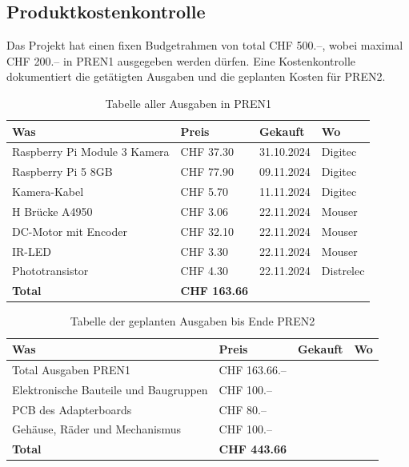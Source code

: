 \documentclass[../main.tex]{subfiles}
\begin{document}
\subsection{Produktkostenkontrolle}
Das Projekt hat einen fixen Budgetrahmen von total CHF 500.--, wobei maximal CHF 200.-- in PREN1 ausgegeben werden dürfen. Eine Kostenkontrolle dokumentiert die getätigten Ausgaben und die geplanten Kosten für PREN2.
\begin{table}[H]
\begin{tabular}{|p{6cm}|p{2.5cm}|p{2cm}|p{2.5cm}|}
\hline
\textbf{Was} & \textbf{Preis} & \textbf{Gekauft} & \textbf{Wo} \\ \hline
Raspberry Pi Module 3 Kamera & CHF 37.30 & 31.10.2024 & Digitec \\ \hline
Raspberry Pi 5 8GB & CHF 77.90 & 09.11.2024 & Digitec \\ \hline
Kamera-Kabel & CHF 5.70 & 11.11.2024 & Digitec \\ \hline
H Brücke A4950 & CHF 3.06 & 22.11.2024 & Mouser \\ \hline
DC-Motor mit Encoder & CHF 32.10 & 22.11.2024 & Mouser \\ \hline
IR-LED & CHF 3.30 & 22.11.2024 & Mouser \\ \hline
Phototransistor & CHF 4.30 & 22.11.2024 & Distrelec \\ \hline
\hline
\textbf{Total} & \textbf{CHF 163.66} & & \\ \hline
\end{tabular}
\caption{Tabelle aller Ausgaben in PREN1}
\label{tab:ausgaben_pren1}
\end{table}

\begin{table}[H]
\begin{tabular}{|p{6cm}|p{2.5cm}|p{2cm}|p{2.5cm}|}
\hline
\textbf{Was} & \textbf{Preis} & \textbf{Gekauft} & \textbf{Wo} \\ \hline
Total Ausgaben PREN1 & CHF 163.66.-- &  &  \\ \hline
Elektronische Bauteile und Baugruppen & CHF 100.-- &  &  \\ \hline
PCB des Adapterboards & CHF 80.-- &  &  \\ \hline
Gehäuse, Räder und Mechanismus & CHF 100.-- &  &  \\ \hline
\hline
\textbf{Total} & \textbf{CHF 443.66} & & \\ \hline
\end{tabular}
\caption{Tabelle der geplanten Ausgaben bis Ende PREN2}
\label{tab:ausgaben_pren2}
\end{table}
\end{document}
